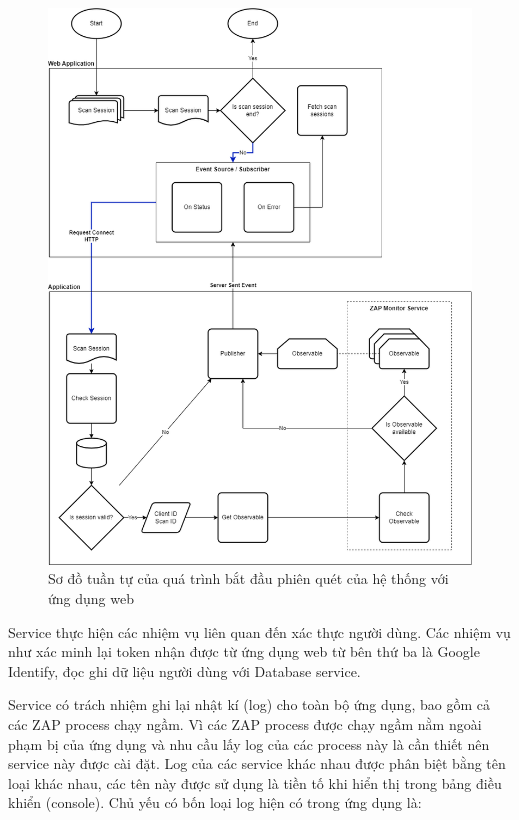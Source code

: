 \begin{figure}[H]
      \centering
      \includegraphics[width=\textwidth]{applied-thesis-chapters/chapter-3/Sơ đồ tuần tự của quá trình bắt đầu phiên quét của hệ thống với ứng dụng web.png}
      \caption{Sơ đồ tuần tự của quá trình bắt đầu phiên quét của hệ thống với ứng dụng web}
      \label{fig:TTHeThongStartScan}
\end{figure}

\tab \tab Service thực hiện các nhiệm vụ liên quan đến xác thực người dùng.
Các nhiệm vụ như xác minh lại token nhận được từ ứng dụng web từ bên thứ ba là Google Identify, đọc ghi dữ liệu người dùng với Database service.

\tab \tab Service có trách nhiệm ghi lại nhật kí (log) cho toàn bộ ứng dụng, bao gồm cả các ZAP process chạy ngầm.
Vì các ZAP process được chạy ngầm nằm ngoài phạm bị của ứng dụng và nhu cầu lấy log của các process này là cần thiết nên service này được cài đặt.
Log của các service khác nhau được phân biệt bằng tên loại khác nhau, các tên này được sử dụng là tiền tố khi hiển thị trong bảng điều khiển (console).
Chủ yếu có bốn loại log hiện có trong ứng dụng là:

